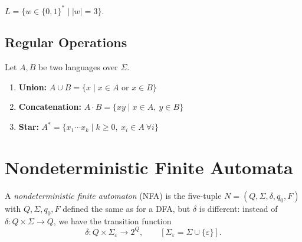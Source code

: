 \begin{example}
$L = \{ w \in \{0,1\}^* \mid |w| = 3 \}$.

\begin{center}
\end{center}
\end{example}

\subsection{Regular Operations}

Let $A, B$ be two languages over $\Sigma$.
\begin{enumerate}[1.]
    \item \textbf{Union:} $A \cup B = \{x \mid x \in A \text{ or } x \in B\}$
    \item \textbf{Concatenation:} $A \cdot B = \{xy \mid x \in A,\ y \in B\}$
    \item \textbf{Star:} $A^* = \{x_1 \cdots x_k \mid k \geq 0,\ x_i \in A\ \forall i\}$
\end{enumerate}

\section{Nondeterministic Finite Automata}

\begin{greybox}
\begin{definition}[NFA]
A \emph{nondeterministic finite automaton} (NFA) is the five-tuple $N = (Q, \Sigma, \delta, q_0, F)$ with $Q, \Sigma, q_0, F$ defined the same as for a DFA, but $\delta$ is different: instead of $\delta : Q \times \Sigma \to Q$, we have the transition function
\[
\delta : Q \times \Sigma_\varepsilon \to 2^Q, \qquad [\Sigma_\varepsilon = \Sigma \cup \{\varepsilon\}].
\]
\end{definition}
\end{greybox}

